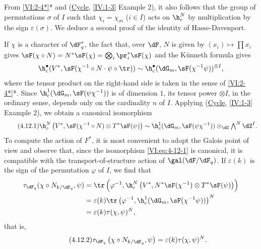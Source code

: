\subsection{}\label{VI:4-12}

From \ref{VI:2-4*}* and (\hyperref[IV]{Cycle}, \ref{IV:1-3} Example 2), it also follows 
that the group of permutations $\sigma$ of $I$ such that 
$\chi_i = \chi_{\sigma i}$ ($i\in I$) acts on $\h_c^N$ by multiplication by 
the sign $\varepsilon(\sigma)$. We deduce a second proof 
of the identity of Hasse-Davenport. 

If $\chi$ is a character of $\dF_q^\ast$, the fact that, over $\dF$, $N$ 
is given by $(x_i)\mapsto \prod x_i$ gives 
$\sF(\chi\circ N)=N^\ast\sF(\chi) = \bigotimes_i \pr_i^\ast\sF(\chi)$ 
and the K\"unneth formula gives 
\[
  \h_c^\bullet(V^\ast,\sF(\chi^{-1}\circ N\cdot \psi\circ \tr)) \sim \h_c^\bullet(\dG_m,\sF(\chi^{-1}\psi))^{\otimes I} \text{,} 
\]
where the tensor product on the right-hand side is taken in the sense of 
\ref{VI:2-4*}*. Since $\h_c^1(\dG_m,\sF(\psi\chi^{-1}))$ is of dimension 
$1$, its tensor power $\otimes I$, in the ordinary sense, depends only on 
the cardinality $n$ of $I$. Applying (\hyperref[IV]{Cycle}, \ref{IV:1-3} Example 
2), we obtain a canonical isomorphism 
\begin{equation*}\tag{4.12.1}\label{VI:eq:4-12-1}
  \h_c^N\left(V^\ast,\sF(\chi^{-1}\circ N)\otimes T^\ast \sF(\psi)\right) \sim \h_c^1(\dG_m,\sF(\psi\chi^{-1})) \otimes_\dZ \textstyle \bigwedge^N \dZ^I \text{.}
\end{equation*}
To compute the action of $F^\ast$, it is most convenient to adopt the Galois 
point of view and observe that, since the isomorphism \eqref{VI:eq:4-12-1} is 
canonical, it is compatible with the transport-of-structure action of 
$\gal(\dF/\dF_q)$. If $\varepsilon(k)$ is the sign of the permutation 
$\varphi$ of $I$, we find that 
\begin{align*} 
  \tau_{\dF_q}(\chi\circ N_{k/\dF_q},\psi) 
    &= \tr\left(\varphi^{-1},\h_c^N\left(V^\ast,N^\ast\sF(\chi^{-1})\otimes T^\ast \sF(\psi)\right)\right) \\ 
    &= \varepsilon(k) \tr\left(\varphi^{-1},\h_c^1(\dG_m,\sF(\chi^{-1}\psi))\right)^N \\
    &= \varepsilon(k) \tau(\chi,\psi)^N \text{,} 
\end{align*}
that is, 
\begin{equation*}\tag{4.12.2}\label{VI:eq:4-12-2}
  \tau_{\dF_q}\left(\chi\circ N_{k/\dF_q},\psi\right) = \varepsilon(k) \tau(\chi,\psi)^N \text{.} 
\end{equation*}


